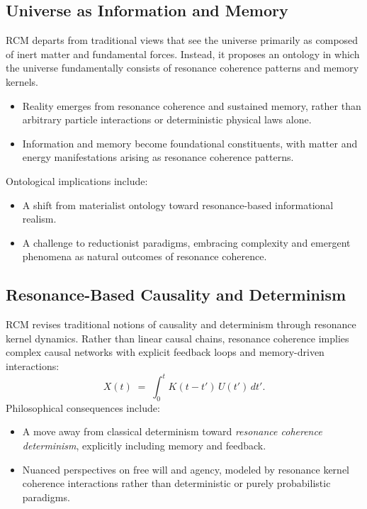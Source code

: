 \subsection{Universe as Information and Memory}
RCM departs from traditional views that see the universe primarily as composed of inert matter and fundamental forces. Instead, it proposes an ontology in which the universe fundamentally consists of resonance coherence patterns and memory kernels.
\begin{itemize}
  \item Reality emerges from resonance coherence and sustained memory, rather than arbitrary particle interactions or deterministic physical laws alone.
  \item Information and memory become foundational constituents, with matter and energy manifestations arising as resonance coherence patterns.
\end{itemize}
Ontological implications include:
\begin{itemize}
  \item A shift from materialist ontology toward resonance-based informational realism.
  \item A challenge to reductionist paradigms, embracing complexity and emergent phenomena as natural outcomes of resonance coherence.
\end{itemize}

\subsection{Resonance-Based Causality and Determinism}
RCM revises traditional notions of causality and determinism through resonance kernel dynamics. Rather than linear causal chains, resonance coherence implies complex causal networks with explicit feedback loops and memory-driven interactions:
\[
X(t) \;=\; \int_{0}^{t} K(t - t')\,U(t')\,dt'.
\]
Philosophical consequences include:
\begin{itemize}
  \item A move away from classical determinism toward \emph{resonance coherence determinism}, explicitly including memory and feedback.
  \item Nuanced perspectives on free will and agency, modeled by resonance kernel coherence interactions rather than deterministic or purely probabilistic paradigms.
\end{itemize}


